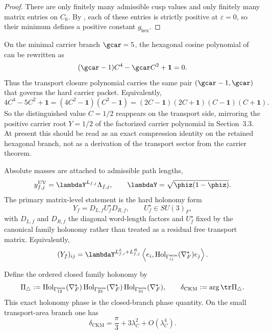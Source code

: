 \begin{proof}
There are only finitely many admissible cusp values and only finitely many matrix entries on
$C_6$. By , each of these entries is strictly positive at
$\varepsilon=0$, so their minimum defines a positive constant $g_{\mathrm{hex}}$.
\end{proof}

\begin{remark}\label{rem:transport-rank-echo}
On the minimal carrier branch $\gcar=5$, the hexagonal cosine polynomial of  can be rewritten as
\[
(\gcar-1)C^4-\gcar C^2+\mathbf 1=0.
\]
Thus the transport closure polynomial carries the same pair $(\gcar-1,\gcar)$ that governs the hard carrier packet. Equivalently,
\[
4C^4-5C^2+\mathbf 1=(4C^2-\mathbf 1)(C^2-\mathbf 1)=(2C-\mathbf 1)(2C+\mathbf 1)(C-\mathbf 1)(C+\mathbf 1).
\]
So the distinguished value $C=1/2$ reappears on the transport side, mirroring the positive carrier root $Y=1/2$ of the factorized carrier polynomial in Section~3.3. At present this should be read as an exact compression identity on the retained hexagonal branch, not as a derivation of the transport sector from the carrier theorem.
\end{remark}

Absolute masses are attached to admissible path lengths,
\begin{equation}
\label{eq:path-length-yukawa}
y_{f,j}^{\mathrm{UV}}=\lambdaY^{L_{f,j}}\Lambda_{f,j},
\qquad
\lambdaY=\sqrt{\phiz(1-\phiz)}.
\end{equation}
The primary matrix-level statement is the hard holonomy form
\begin{equation}
\label{eq:yukawa-matrix-factorization}
Y_f=D_{L,f}U_f^\star D_{R,f},
\qquad
U_f^\star\in SU(3)_F,
\end{equation}
with $D_{L,f}$ and $D_{R,f}$ the diagonal word-length factors and $U_f^\star$ fixed by the
canonical family holonomy rather than treated as a residual free transport matrix. Equivalently,
\begin{equation}
\label{eq:yukawa-holonomy-matrix}
(Y_f)_{ij}
=
\lambdaY^{L^L_{f,i}+L^R_{f,j}}
\left\langle e_i,\mathrm{Hol}_{\Gamma_{ij}^{\min}}(\nabla_F^\star)e_j\right\rangle.
\end{equation}
\begin{theorem}
\label{prop:holonomy-triangle-phase}
\label{prop:exact-family-holonomy-phase}
Define the ordered closed family holonomy by
\[
\Pi_\triangle
:=
\mathrm{Hol}_{\Gamma_{12}^{\min}}(\nabla_F^\star)\,
\mathrm{Hol}_{\Gamma_{23}^{\min}}(\nabla_F^\star)\,
\mathrm{Hol}_{\Gamma_{31}^{\min}}(\nabla_F^\star),
\qquad
\delta_{\mathrm{CKM}}
:=
\arg\tr\Pi_\triangle.
\]
This exact holonomy phase is the closed-branch phase quantity. On the
small transport-area branch one has
\begin{equation}
\label{eq:ckm-holonomy-phase}
\delta_{\mathrm{CKM}}
=
\frac{\pi}{3}+3\lambda_C^2+O(\lambda_C^4).
\end{equation}
\end{theorem}

